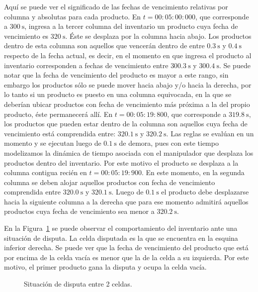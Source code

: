 \documentclass[10pt]{article}
\begin{document}
Aquí se puede ver el significado de las fechas de vencimiento relativas por columna y absolutas para cada producto. En $t = 00:05:00:000$, que corresponde a $300~\textrm{s}$, ingresa a la tercer columna del inventario un producto cuya fecha de vencimiento es $320~\textrm{s}$. Éste se desplaza por la columna hacia abajo. Los productos dentro de esta columna son aquellos que vencerán dentro de entre $0.3~\textrm{s}$ y $0.4~\textrm{s}$ respecto de la fecha actual, es decir, en el momento en que ingresa el producto al inventario corresponden a fechas de vencimiento entre $300.3~\textrm{s}$ y $300.4~\textrm{s}$. Se puede notar que la fecha de vencimiento del producto es mayor a este rango, sin embargo los productos sólo se puede mover hacia abajo y/o hacia la derecha, por lo tanto si un producto es puesto en una columna equivocada, en la que se deberían ubicar productos con fecha de vencimiento más próxima a la del propio producto, éste permanecerá allí. En $t = 00:05:19:800$, que corresponde a $319.8~\textrm{s}$, los productos que pueden estar dentro de la columna son aquellos cuya fecha de vencimiento está comprendida entre: $320.1~\textrm{s}$ y $320.2~\textrm{s}$. Las reglas se evalúan en un momento y se ejecutan luego de $0.1~\textrm{s}$ de demora, pues con este tiempo modelizamos la dinámica de tiempo asociada con el manipulador que desplaza los productos dentro del inventario. Por este motivo el producto se desplaza a la columna contigua recién en $t = 00:05:19:900$. En este momento, en la segunda columna se deben alojar aquellos productos con fecha de vencimiento comprendida entre $320.0~\textrm{s}$ y $320.1~\textrm{s}$. Luego de $0.1~\textrm{s}$ el producto debe desplazarse hacia la siguiente columna a la derecha que para ese momento admitirá aquellos productos cuya fecha de vencimiento sea menor a $320.2~\textrm{s}$.

En la Figura~\ref{fig:IP-ensayodisputa} se puede observar el comportamiento del inventario ante una situación de disputa. La celda disputada es la que se encuentra en la esquina inferior derecha. Se puede ver que la fecha de vencimiento del producto que está por encima de la celda vacía es menor que la de la celda a su izquierda. Por este motivo, el primer producto gana la disputa y ocupa la celda vacía.

\begin{figure}[h] 
	\centering
	\hfill
	\hfill
	\caption{Situación de disputa entre 2 celdas.} 
	\label{fig:IP-ensayodisputa} 
\end{figure}
\FloatBarrier
\end{document}
